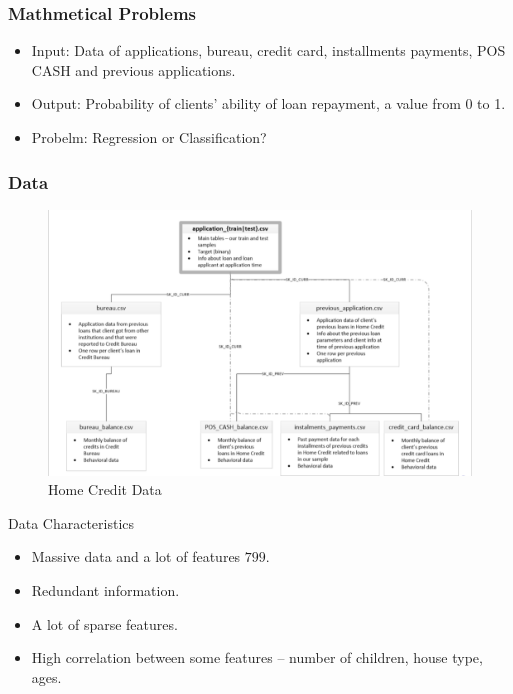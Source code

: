 \documentclass{beamer}
\begin{document}

\begin{frame}
\frametitle{Mathmetical Problems}
\begin{itemize}
\item Input: Data of applications, bureau, credit card, installments payments, POS CASH and previous applications.
\item Output: Probability of clients' ability of loan repayment, a value from 0 to 1. 
\item Probelm: Regression or Classification? 
\end{itemize}


\end{frame}

\begin{frame}
\frametitle{Data}
\begin{figure}
  \includegraphics[width=\linewidth]{pic/Home_Credit_data.png}
  \caption{Home Credit Data}
  \label{fig:data}
\end{figure}
\end{frame}

\begin{frame}{Data Characteristics}
\begin{itemize}
\item Massive data and a lot of features $799$. 
\item Redundant information. 
\item A lot of sparse features. 
\item High correlation between some features -- number of children, house type, ages. 
\end{itemize}
\end{frame}
\end{document}

